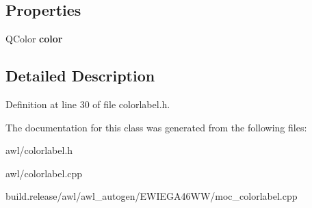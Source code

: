 \subsection*{Properties}
\begin{DoxyCompactItemize}
\item 
\mbox{\label{class_awl_1_1_color_label_adc04dfba48589e11be28e2f40cc41a60}} 
Q\+Color {\bfseries color}
\end{DoxyCompactItemize}


\subsection{Detailed Description}


Definition at line 30 of file colorlabel.\+h.



The documentation for this class was generated from the following files\+:\begin{DoxyCompactItemize}
\item 
awl/colorlabel.\+h\item 
awl/colorlabel.\+cpp\item 
build.\+release/awl/awl\+\_\+autogen/\+E\+W\+I\+E\+G\+A46\+W\+W/moc\+\_\+colorlabel.\+cpp\end{DoxyCompactItemize}
